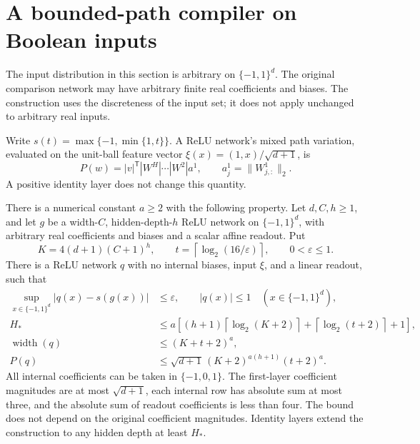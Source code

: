\section{A bounded-path compiler on Boolean inputs}
\label{sec:boolean-compiler}
The input distribution in this section is arbitrary on $\{-1,1\}^d$. The original comparison network may have arbitrary finite real coefficients and biases. The construction uses the discreteness of the input set; it does not apply unchanged to arbitrary real inputs.

Write $s(t)=\max\{-1,\min\{1,t\}\}$. A ReLU network's mixed path variation, evaluated on the unit-ball feature vector $\xi(x)=(1,x)/\sqrt{d+1}$, is
\[
 P(w)=|v|^{\mathsf T}|W^H|\cdots|W^2|a^1,
 \qquad a^1_j=\|W^1_{j,:}\|_2.
\]
A positive identity layer does not change this quantity.

\begin{theorem}
\label{thm:boolean-compiler}
There is a numerical constant $a\ge2$ with the following property. Let $d,C,h\ge1$, and let $g$ be a width-$C$, hidden-depth-$h$ ReLU network on $\{-1,1\}^d$, with arbitrary real coefficients and biases and a scalar affine readout. Put
\[
 K=4(d+1)(C+1)^h,\qquad
 t=\left\lceil\log_2(16/\varepsilon)\right\rceil,
 \qquad 0<\varepsilon\le1.
\]
There is a ReLU network $q$ with no internal biases, input $\xi$, and a linear readout, such that
\begin{align}
 \sup_{x\in\{-1,1\}^d}|q(x)-s(g(x))|&\le\varepsilon,
 \qquad |q(x)|\le1\quad(x\in\{-1,1\}^d),\label{eq:boolean-approximation}\\
 H_*&\le a\left[(h+1)\left\lceil\log_2(K+2)\right\rceil
                   +\left\lceil\log_2(t+2)\right\rceil+1\right],\label{eq:boolean-depth}\\
 \operatorname{width}(q)&\le(K+t+2)^a,\label{eq:boolean-width}\\
 P(q)&\le\sqrt{d+1}\,(K+2)^{a(h+1)}(t+2)^a.
 \label{eq:boolean-path}
\end{align}
All internal coefficients can be taken in $\{-1,0,1\}$. The first-layer coefficient magnitudes are at most $\sqrt{d+1}$, each internal row has absolute sum at most three, and the absolute sum of readout coefficients is less than four. The bound does not depend on the original coefficient magnitudes. Identity layers extend the construction to any hidden depth at least $H_*$.
\end{theorem}


